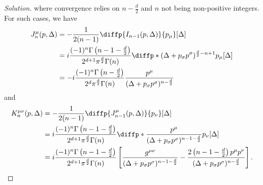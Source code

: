 \begin{proof}[Solution]
   where convergence relies on \(n - \frac{d}{2}\) and \(n\) not being non-positive integers. For such cases, we have
   \begin{align*}
      J^\mu_{n}(p, \Delta) &= - \frac{1}{2(n - 1)} \diffp{I_{n - 1}(p, \Delta)}{p_\mu}[\Delta]\\
                           &= i\frac{(-1)^n \Gamma\left(n - 1 - \frac{d}{2}\right)}{2^{d+1}  \pi^{\frac{d}{2}} \Gamma(n)} \diffp*{(\Delta + p_\sigma p^\sigma)^{\frac{d}{2} - n + 1}}{p_\mu}[\Delta]\\
                           &= -i\frac{(-1)^{n} \Gamma\left(n - \frac{d}{2}\right)}{2^{d}  \pi^{\frac{d}{2}} \Gamma(n)} \frac{p^\mu}{(\Delta + p_\sigma p^\sigma)^{n - \frac{d}{2}}}
   \end{align*}
   and
   \begin{align*}
      K^{\mu\nu}_{n}(p, \Delta) &= - \frac{1}{2(n - 1)} \diffp{J^\mu_{n - 1}(p, \Delta)}{p_\nu}[\Delta]\\
                                &= i\frac{(-1)^n \Gamma\left(n - 1 - \frac{d}{2}\right)}{2^{d+1}  \pi^{\frac{d}{2}} \Gamma(n)} \diffp*{\frac{p^\mu}{(\Delta + p_\sigma p^\sigma)^{n - 1 - \frac{d}{2}}}}{p_\nu}[\Delta]\\
                                &= i\frac{(-1)^n \Gamma\left(n - 1 - \frac{d}{2}\right)}{2^{d+1}  \pi^{\frac{d}{2}} \Gamma(n)} \left[\frac{g^{\mu\nu}}{(\Delta + p_\sigma p^\sigma)^{n - 1 - \frac{d}{2}}} - \frac{2\left(n - 1 - \frac{d}{2}\right) p^\mu p^\nu}{(\Delta +p_\sigma p^\sigma)^{n - \frac{d}{2}}}\right].
   \end{align*}
\end{proof}

